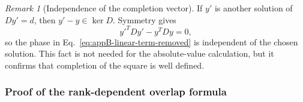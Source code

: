 \documentclass[11pt]{article}
\newcommand{\1}{\mathbf 1}
\theoremstyle{plain}
\theoremstyle{definition}
\theoremstyle{remark}
\newtheorem{remark}[theorem]{Remark}
\begin{document}
\begin{remark}[Independence of the completion vector]
\label{rem:appB-completion-vector-independence}
If $y'$ is another solution of $Dy'=d$, then $y'-y\in\ker D$.  Symmetry gives
\begin{equation}
  y'^TDy'-y^TDy=0,
  \label{eq:appB-completion-vector-phase-independent}
\end{equation}
so the phase in Eq.~\eqref{eq:appB-linear-term-removed} is independent of the
chosen solution.  This fact is not needed for the absolute-value calculation,
but it confirms that completion of the square is well defined.
\end{remark}

\subsubsection{Proof of the rank-dependent overlap formula}
\label{appsubsec:proof-rank-dependent-overlap}
\end{document}
